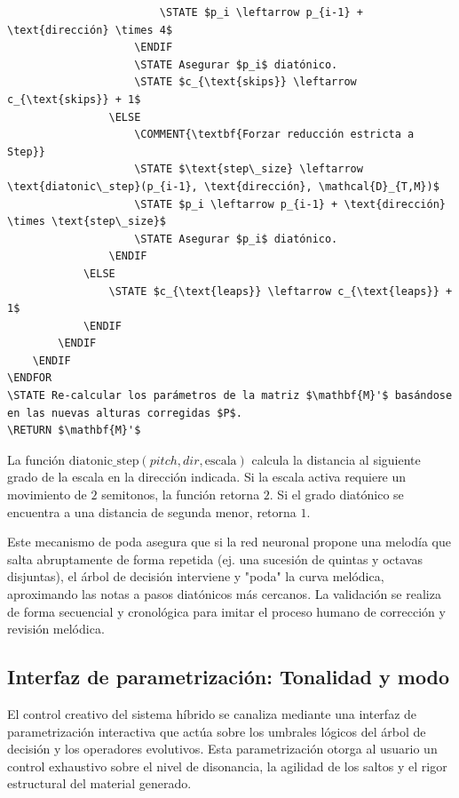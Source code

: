 \documentclass[12pt]{report}
\begin{document}
\begin{verbatim}
                        \STATE $p_i \leftarrow p_{i-1} + \text{dirección} \times 4$
                    \ENDIF
                    \STATE Asegurar $p_i$ diatónico.
                    \STATE $c_{\text{skips}} \leftarrow c_{\text{skips}} + 1$
                \ELSE
                    \COMMENT{\textbf{Forzar reducción estricta a Step}}
                    \STATE $\text{step\_size} \leftarrow \text{diatonic\_step}(p_{i-1}, \text{dirección}, \mathcal{D}_{T,M})$
                    \STATE $p_i \leftarrow p_{i-1} + \text{dirección} \times \text{step\_size}$
                    \STATE Asegurar $p_i$ diatónico.
                \ENDIF
            \ELSE
                \STATE $c_{\text{leaps}} \leftarrow c_{\text{leaps}} + 1$
            \ENDIF
        \ENDIF
    \ENDIF
\ENDFOR
\STATE Re-calcular los parámetros de la matriz $\mathbf{M}'$ basándose en las nuevas alturas corregidas $P$.
\RETURN $\mathbf{M}'$
\end{verbatim}

La función $\text{diatonic\_step}(pitch, dir, \text{escala})$ calcula la distancia al siguiente grado de la escala en la dirección indicada. Si la escala activa requiere un movimiento de $2$ semitonos, la función retorna $2$. Si el grado diatónico se encuentra a una distancia de segunda menor, retorna $1$.

Este mecanismo de poda asegura que si la red neuronal propone una melodía que salta abruptamente de forma repetida (ej. una sucesión de quintas y octavas disjuntas), el árbol de decisión interviene y "poda" la curva melódica, aproximando las notas a pasos diatónicos más cercanos. La validación se realiza de forma secuencial y cronológica para imitar el proceso humano de corrección y revisión melódica.

\subsection{Interfaz de parametrización: Tonalidad y modo}

El control creativo del sistema híbrido se canaliza mediante una interfaz de parametrización interactiva que actúa sobre los umbrales lógicos del árbol de decisión y los operadores evolutivos. Esta parametrización otorga al usuario un control exhaustivo sobre el nivel de disonancia, la agilidad de los saltos y el rigor estructural del material generado. 
\end{document}
